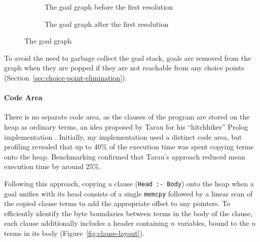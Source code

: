 \begin{figure}[H]
\begin{subfigure}{.5\textwidth}
\vspace{5mm}
\caption{The goal graph before the first resolution}
\end{subfigure}%
\begin{subfigure}{.5\textwidth}
\centering
{}
\vspace{5mm}
\caption{The goal graph after the first resolution}
\end{subfigure}
\vspace*{-5mm}
\caption{The goal graph}
\label{fig:goals}
\end{figure}

\vspace*{-1em}

To avoid the need to garbage collect the goal stack, goals are removed from the graph when they are popped if they are not reachable from any choice points (Section~\ref{sec:choice-point-elimination}).

\paragraph{Code Area} There is no separate code area, as the clauses of the program are stored on the heap as ordinary terms, an idea proposed by Tarau for his ``hitchhiker'' Prolog implementation \cite{tarauHitchhikersGuideReinventing2018}. Initially, my implementation used a distinct code area, but profiling revealed that up to 40\% of the execution time was spent copying terms onto the heap. Benchmarking confirmed that Tarau's approach reduced mean execution time by around 25\%.

Following this approach, copying a clause (\texttt{Head :- Body}) onto the heap when a goal unifies with its head consists of a single \texttt{memcpy} followed by a linear scan of the copied clause terms to add the appropriate offset to any pointers. To efficiently identify the byte boundaries between terms in the body of the clause, each clause additionally includes a header containing $n$ variables, bound to the $n$ terms in its body (Figure~\ref{fig:clause-layout}).

